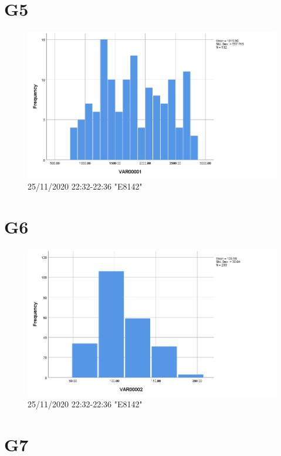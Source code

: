 \documentclass[hidelinks, 12pt, a4paper]{article}
\begin{document}
\section{G5}

\begin{figure}[h!]
	\centering
		\includegraphics[height=.38\textheight, width=\textwidth]{assets/session1/g5.png}
    \caption{25/11/2020 22:32-22:36 "E8142"} 
	\end{figure}

\section{G6}

\begin{figure}[h!]
	\centering
		\includegraphics[height=.38\textheight, width=\textwidth]{assets/session1/g6.png}
    \caption{25/11/2020 22:32-22:36 "E8142"} 
	\end{figure}

\section{G7}
\end{document}
